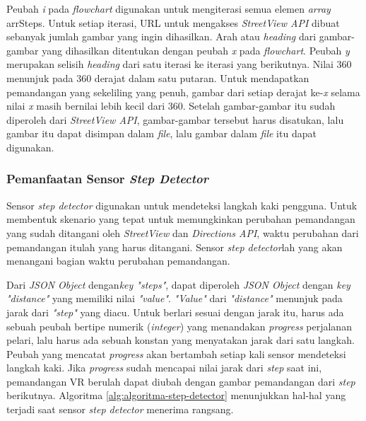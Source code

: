 Peubah \textit{i} pada \textit{flowchart} digunakan untuk mengiterasi semua elemen \textit{array} arrSteps. Untuk setiap iterasi, URL untuk mengakses \textit{StreetView API} dibuat sebanyak jumlah gambar yang ingin dihasilkan. Arah atau \textit{heading} dari gambar-gambar yang dihasilkan ditentukan dengan peubah \textit{x} pada \textit{flowchart}. Peubah \textit{y} merupakan selisih \textit{heading} dari satu iterasi ke iterasi yang berikutnya. Nilai 360 menunjuk pada 360 derajat dalam satu putaran. Untuk mendapatkan pemandangan yang sekeliling yang penuh, gambar dari setiap derajat ke-\textit{x} selama nilai \textit{x} masih bernilai lebih kecil dari 360. Setelah gambar-gambar  itu sudah diperoleh dari \textit{StreetView API}, gambar-gambar tersebut harus disatukan, lalu gambar itu dapat disimpan dalam \textit{file}, lalu gambar dalam \textit{file} itu dapat digunakan. 

\subsubsection{Pemanfaatan Sensor \textit{Step Detector}}
Sensor \textit{step detector} digunakan untuk mendeteksi langkah kaki pengguna. Untuk membentuk skenario yang tepat untuk memungkinkan perubahan pemandangan yang sudah ditangani oleh \textit{StreetView} dan \textit{Directions API}, waktu perubahan dari pemandangan itulah yang harus ditangani. Sensor \textit{step detector}lah yang akan menangani bagian waktu perubahan pemandangan. 

Dari \textit{JSON Object} dengan\textit{key "steps"}, dapat diperoleh \textit{JSON Object} dengan \textit{key "distance"} yang memiliki  nilai \textit{"value"}. \textit{"Value"} dari \textit{"distance"} menunjuk pada jarak dari \textit{"step"} yang diacu. Untuk berlari sesuai dengan jarak itu, harus ada sebuah peubah bertipe numerik (\textit{integer}) yang menandakan \textit{progress} perjalanan pelari, lalu harus ada sebuah konstan yang menyatakan jarak dari satu langkah. Peubah yang mencatat \textit{progress} akan bertambah setiap kali sensor mendeteksi langkah kaki. Jika \textit{progress} sudah mencapai nilai jarak dari \textit{step} saat ini, pemandangan VR berulah dapat diubah dengan gambar pemandangan dari \textit{step} berikutnya. Algoritma \ref{alg:algoritma-step-detector} menunjukkan hal-hal yang terjadi saat  sensor \textit{step detector} menerima rangsang. 

